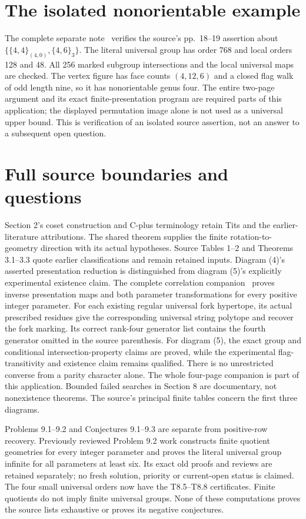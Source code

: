 \documentclass[10pt,a4paper]{article}
\begin{document}
\section{The isolated nonorientable example}
The complete separate note~\cite{order768} verifies the source's
pp.~18--19 assertion about
$\{\{4,4\}_{(4,0)},\{4,6\}_3\}$.
The literal universal group has order 768 and local orders 128 and 48.
All 256 marked subgroup intersections and the local universal maps are
checked. The vertex figure has face counts $(4,12,6)$ and a closed flag
walk of odd length nine, so it has nonorientable genus four.
The entire two-page argument and its exact finite-presentation program
are required parts of this application; the displayed permutation image
alone is not used as a universal upper bound. This is verification of an
isolated source assertion, not an answer to a subsequent open question.

\section{Full source boundaries and questions}
Section 2's coset construction and C-plus terminology retain Tits and
the earlier-literature attributions. The shared theorem supplies the
finite rotation-to-geometry direction with its actual hypotheses.
Source Tables 1--2 and Theorems 3.1--3.3 quote earlier classifications
and remain retained inputs. Diagram (4)'s asserted presentation reduction
is distinguished from diagram (5)'s explicitly experimental existence
claim. The complete correlation companion~\cite{correlations} proves inverse
presentation maps and both parameter transformations for every positive
integer parameter. For each existing regular universal fork hypertope,
its actual prescribed residues give the corresponding universal string
polytope and recover the fork marking. Its correct rank-four generator
list contains the fourth generator omitted in the source parenthesis.
For diagram (5), the exact group and conditional intersection-property
claims are proved, while the experimental flag-transitivity and existence
claim remains qualified. There is no unrestricted converse from a parity
character alone. The whole four-page companion is part of this application.
Bounded failed searches in Section 8 are documentary, not nonexistence
theorems. The source's principal finite tables concern the first three
diagrams.

Problems 9.1--9.2 and Conjectures 9.1--9.3 are separate from positive-row
recovery. Previously reviewed Problem 9.2 work constructs finite
quotient geometries for every integer parameter and proves the literal
universal group infinite for all parameters at least six. Its exact
old proofs and reviews are retained separately; no fresh solution,
priority or current-open status is claimed. The four small universal
orders now have the T8.5--T8.8 certificates. Finite quotients do not
imply finite universal groups. None of these computations proves the
source lists exhaustive or proves its negative conjectures.
\end{document}
